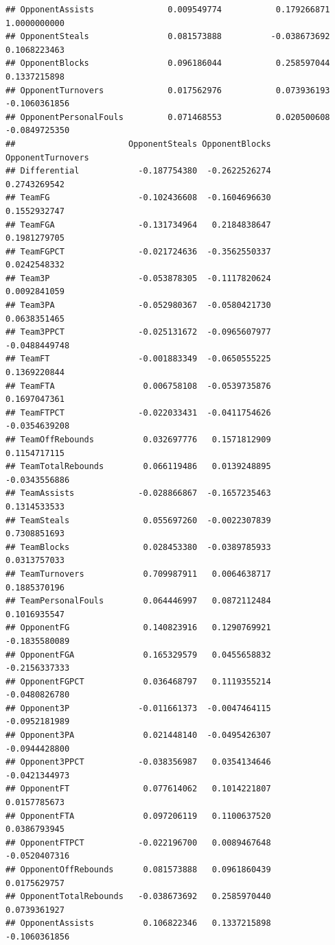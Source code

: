 \documentclass[]{book}
\begin{document}
\begin{verbatim}
## OpponentAssists               0.009549774           0.179266871    1.0000000000
## OpponentSteals                0.081573888          -0.038673692    0.1068223463
## OpponentBlocks                0.096186044           0.258597044    0.1337215898
## OpponentTurnovers             0.017562976           0.073936193   -0.1060361856
## OpponentPersonalFouls         0.071468553           0.020500608   -0.0849725350
##                       OpponentSteals OpponentBlocks OpponentTurnovers
## Differential            -0.187754380  -0.2622526274      0.2743269542
## TeamFG                  -0.102436608  -0.1604696630      0.1552932747
## TeamFGA                 -0.131734964   0.2184838647      0.1981279705
## TeamFGPCT               -0.021724636  -0.3562550337      0.0242548332
## Team3P                  -0.053878305  -0.1117820624      0.0092841059
## Team3PA                 -0.052980367  -0.0580421730      0.0638351465
## Team3PPCT               -0.025131672  -0.0965607977     -0.0488449748
## TeamFT                  -0.001883349  -0.0650555225      0.1369220844
## TeamFTA                  0.006758108  -0.0539735876      0.1697047361
## TeamFTPCT               -0.022033431  -0.0411754626     -0.0354639208
## TeamOffRebounds          0.032697776   0.1571812909      0.1154717115
## TeamTotalRebounds        0.066119486   0.0139248895     -0.0343556886
## TeamAssists             -0.028866867  -0.1657235463      0.1314533533
## TeamSteals               0.055697260  -0.0022307839      0.7308851693
## TeamBlocks               0.028453380  -0.0389785933      0.0313757033
## TeamTurnovers            0.709987911   0.0064638717      0.1885370196
## TeamPersonalFouls        0.064446997   0.0872112484      0.1016935547
## OpponentFG               0.140823916   0.1290769921     -0.1835580089
## OpponentFGA              0.165329579   0.0455658832     -0.2156337333
## OpponentFGPCT            0.036468797   0.1119355214     -0.0480826780
## Opponent3P              -0.011661373  -0.0047464115     -0.0952181989
## Opponent3PA              0.021448140  -0.0495426307     -0.0944428800
## Opponent3PPCT           -0.038356987   0.0354134646     -0.0421344973
## OpponentFT               0.077614062   0.1014221807      0.0157785673
## OpponentFTA              0.097206119   0.1100637520      0.0386793945
## OpponentFTPCT           -0.022196700   0.0089467648     -0.0520407316
## OpponentOffRebounds      0.081573888   0.0961860439      0.0175629757
## OpponentTotalRebounds   -0.038673692   0.2585970440      0.0739361927
## OpponentAssists          0.106822346   0.1337215898     -0.1060361856

\end{verbatim}
\end{document}
